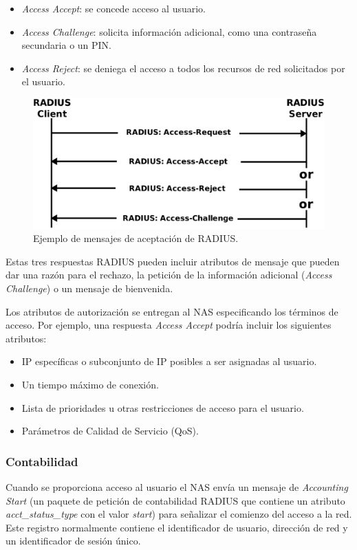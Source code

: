 \begin{itemize}
\item \emph{Access Accept}: se concede acceso al usuario.
\item \emph{Access Challenge}: solicita información adicional, como una contraseña secundaria o un PIN.
\item \emph{Access Reject}: se deniega el acceso a todos los recursos de red solicitados por el usuario.
\end{itemize}

\begin{figure}[!t]
\begin{center}
\includegraphics[width=0.75\linewidth]{./3_Tecnologias/Img/RADIUSAccept.png}
\end{center}
\caption{Ejemplo de mensajes de aceptación de RADIUS.}
\label{RADIUSAccept}
\end{figure}

Estas tres respuestas RADIUS pueden incluir atributos de mensaje que pueden dar una razón para el rechazo, la petición de la información adicional (\emph{Access Challenge}) o un mensaje de bienvenida.

Los atributos de autorización se entregan al NAS especificando los términos de acceso. Por ejemplo, una respuesta \emph{Access Accept} podría incluir los siguientes atributos:

\begin{itemize}
\item IP específicas o subconjunto de IP posibles a ser asignadas al usuario.
\item Un tiempo máximo de conexión.
\item Lista de prioridades u otras restricciones de acceso para el usuario.
\item Parámetros de Calidad de Servicio (\acrshort{QoS}).
\end{itemize}

\subsubsection{Contabilidad}
Cuando se proporciona acceso al usuario el NAS envía un mensaje de \emph{Accounting Start} (un paquete de petición de contabilidad RADIUS que contiene un atributo \emph{acct\_status\_type} con el valor \emph{start}) para señalizar el comienzo del acceso a la red. Este registro normalmente contiene el identificador de usuario, dirección de red y un identificador de sesión único.


